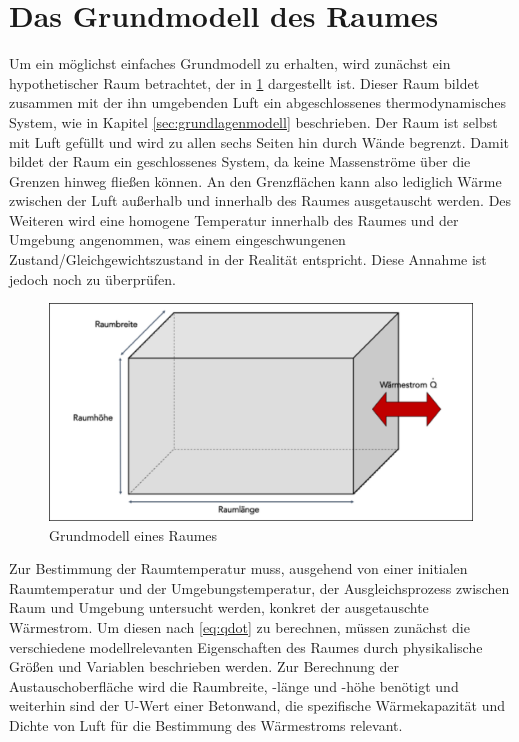 \section{Das Grundmodell des Raumes}

Um ein möglichst einfaches Grundmodell zu erhalten, wird zunächst ein hypothetischer Raum betrachtet, der in \ref{fig:grundraum} dargestellt ist. Dieser Raum bildet zusammen mit der ihn umgebenden Luft ein abgeschlossenes thermodynamisches System, wie in Kapitel \ref{sec:grundlagenmodell} beschrieben. Der Raum ist selbst mit Luft gefüllt und wird zu allen sechs Seiten hin durch Wände begrenzt. Damit bildet der Raum ein geschlossenes System, da keine Massenströme über die Grenzen hinweg fließen können. An den Grenzflächen kann also lediglich Wärme zwischen der Luft außerhalb und innerhalb des Raumes ausgetauscht werden. Des Weiteren wird eine homogene Temperatur innerhalb des Raumes und der Umgebung angenommen, was einem eingeschwungenen Zustand/Gleichgewichtszustand in der Realität entspricht. Diese Annahme ist jedoch noch zu überprüfen.

\begin{figure}
\centering
\includegraphics[width=\textwidth]{abbildungen/20160316_grundraum}
\caption{Grundmodell eines Raumes}
\label{fig:grundraum}
\end{figure}

Zur Bestimmung der Raumtemperatur muss, ausgehend von einer initialen Raumtemperatur und der Umgebungstemperatur, der Ausgleichsprozess zwischen Raum und Umgebung untersucht werden, konkret der ausgetauschte Wärmestrom. Um diesen nach \ref{eq:qdot} zu berechnen, müssen zunächst die verschiedene modellrelevanten Eigenschaften des Raumes durch physikalische Größen und Variablen beschrieben werden. Zur Berechnung der Austauschoberfläche wird die Raumbreite, -länge und -höhe benötigt und weiterhin sind der U-Wert einer Betonwand, die spezifische Wärmekapazität und Dichte von Luft für die Bestimmung des Wärmestroms relevant.

